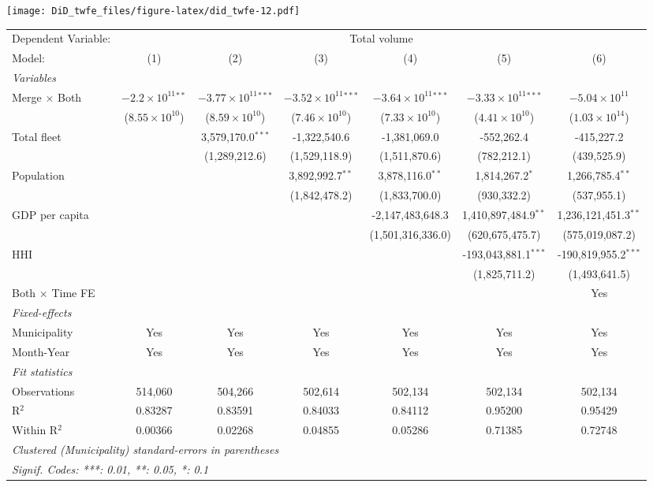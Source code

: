 \documentclass[
]{article}
\begin{document}
\texttt{[image: DiD\_twfe\_files/figure-latex/did\_twfe-12.pdf]}

\begin{tabular}{lcccccc}
\tabularnewline\midrule\midrule
Dependent Variable:&\multicolumn{6}{c}{Total volume}\\
Model:&(1) & (2) & (3) & (4) & (5) & (6)\\
\midrule \emph{Variables}&   &   &   &   &   &  \\
Merge $\times $ Both & $-2.2\times 10^{11}$$^{**}$ & $-3.77\times 10^{11}$$^{***}$ & $-3.52\times 10^{11}$$^{***}$ & $-3.64\times 10^{11}$$^{***}$ & $-3.33\times 10^{11}$$^{***}$ & $-5.04\times 10^{11}$\\
  &($8.55\times 10^{10}$) & ($8.59\times 10^{10}$) & ($7.46\times 10^{10}$) & ($7.33\times 10^{10}$) & ($4.41\times 10^{10}$) & ($1.03\times 10^{14}$)\\
Total fleet &    & 3,579,170.0$^{***}$ & -1,322,540.6 & -1,381,069.0 & -552,262.4 & -415,227.2\\
  &   & (1,289,212.6) & (1,529,118.9) & (1,511,870.6) & (782,212.1) & (439,525.9)\\
Population &    &    & 3,892,992.7$^{**}$ & 3,878,116.0$^{**}$ & 1,814,267.2$^{*}$ & 1,266,785.4$^{**}$\\
  &   &    & (1,842,478.2) & (1,833,700.0) & (930,332.2) & (537,955.1)\\
GDP per capita &    &    &    & -2,147,483,648.3 & 1,410,897,484.9$^{**}$ & 1,236,121,451.3$^{**}$\\
  &   &    &    & (1,501,316,336.0) & (620,675,475.7) & (575,019,087.2)\\
HHI &    &    &    &    & -193,043,881.1$^{***}$ & -190,819,955.2$^{***}$\\
  &   &    &    &    & (1,825,711.2) & (1,493,641.5)\\
Both $\times$ Time FE &  &  &  &  &  & Yes\\
\midrule \emph{Fixed-effects}&   &   &   &   &   &  \\
Municipality & Yes & Yes & Yes & Yes & Yes & Yes\\
Month-Year & Yes & Yes & Yes & Yes & Yes & Yes\\
\midrule \emph{Fit statistics}&  & & & & & \\
Observations & 514,060&504,266&502,614&502,134&502,134&502,134\\
R$^2$ & 0.83287&0.83591&0.84033&0.84112&0.95200&0.95429\\
Within R$^2$ & 0.00366&0.02268&0.04855&0.05286&0.71385&0.72748\\
\midrule\midrule\multicolumn{7}{l}{\emph{Clustered (Municipality) standard-errors in parentheses}}\\
\multicolumn{7}{l}{\emph{Signif. Codes: ***: 0.01, **: 0.05, *: 0.1}}\\
\end{tabular}
\end{document}
